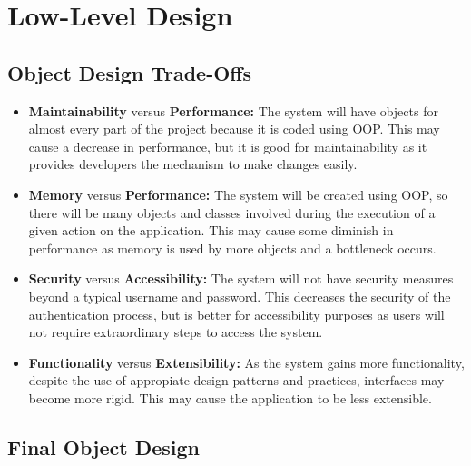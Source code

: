 \documentclass[a4paper, 12pt, titlepage]{article}
\begin{document}
  \section{Low-Level Design}

  \subsection{Object Design Trade-Offs}

  \begin{itemize}
    \item \textbf{Maintainability} versus \textbf{Performance:}
      The system will have objects for almost every part of the project because it is coded using OOP.
      This may cause a decrease in performance, but it is good for maintainability
      as it provides developers the mechanism to make changes easily.
    \item \textbf{Memory} versus \textbf{Performance:}
      The system will be created using OOP, so there will be many objects and classes involved
      during the execution of a given action on the application.
      This may cause some diminish in performance as memory is used by more objects and a bottleneck occurs.
    \item \textbf{Security} versus \textbf{Accessibility:}
      The system will not have security measures beyond a typical username and password.
      This decreases the security of the authentication process, but is better for accessibility purposes
      as users will not require extraordinary steps to access the system.
    \item \textbf{Functionality} versus \textbf{Extensibility:}
      As the system gains more functionality, despite the use of appropiate design patterns and practices,
      interfaces may become more rigid. This may cause the application to be less extensible.
  \end{itemize}

  \subsection{Final Object Design}
\end{document}
